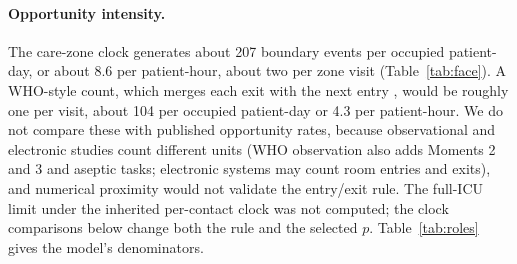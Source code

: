 \paragraph{Opportunity intensity.} The care-zone clock generates about 207
boundary events per occupied patient-day, or about 8.6 per patient-hour, about two per
zone visit (Table~\ref{tab:face}). A WHO-style count, which merges each exit with
the next entry \citep{who2009}, would be roughly one per visit, about 104 per
occupied patient-day or 4.3 per patient-hour. We do not compare these with
published opportunity rates, because observational and electronic studies count
different units (WHO observation also adds Moments 2 and 3 and aseptic tasks;
electronic systems may count room entries and exits), and numerical proximity
would not validate the entry/exit rule. The full-ICU limit under the inherited
per-contact clock was not computed; the clock comparisons below change both the
rule and the selected $p$. Table~\ref{tab:roles} gives the model's denominators.

